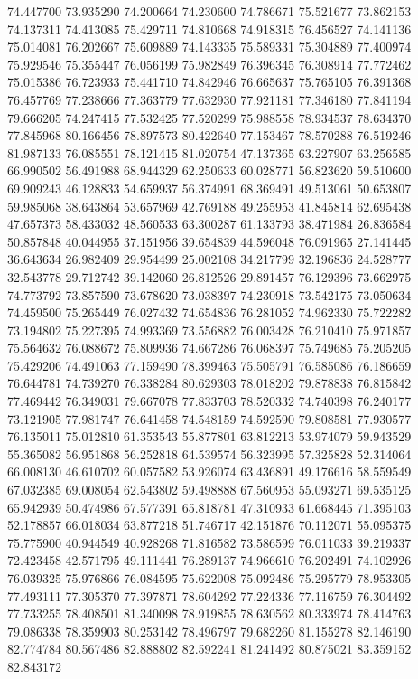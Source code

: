 74.447700
73.935290
74.200664
74.230600
74.786671
75.521677
73.862153
74.137311
74.413085
75.429711
74.810668
74.918315
76.456527
74.141136
75.014081
76.202667
75.609889
74.143335
75.589331
75.304889
77.400974
75.929546
75.355447
76.056199
75.982849
76.396345
76.308914
77.772462
75.015386
76.723933
75.441710
74.842946
76.665637
75.765105
76.391368
76.457769
77.238666
77.363779
77.632930
77.921181
77.346180
77.841194
79.666205
74.247415
77.532425
77.520299
75.988558
78.934537
78.634370
77.845968
80.166456
78.897573
80.422640
77.153467
78.570288
76.519246
81.987133
76.085551
78.121415
81.020754
47.137365
63.227907
63.256585
66.990502
56.491988
68.944329
62.250633
60.028771
56.823620
59.510600
69.909243
46.128833
54.659937
56.374991
68.369491
49.513061
50.653807
59.985068
38.643864
53.657969
42.769188
49.255953
41.845814
62.695438
47.657373
58.433032
48.560533
63.300287
61.133793
38.471984
26.836584
50.857848
40.044955
37.151956
39.654839
44.596048
76.091965
27.141445
36.643634
26.982409
29.954499
25.002108
34.217799
32.196836
24.528777
32.543778
29.712742
39.142060
26.812526
29.891457
76.129396
73.662975
74.773792
73.857590
73.678620
73.038397
74.230918
73.542175
73.050634
74.459500
75.265449
76.027432
74.654836
76.281052
74.962330
75.722282
73.194802
75.227395
74.993369
73.556882
76.003428
76.210410
75.971857
75.564632
76.088672
75.809936
74.667286
76.068397
75.749685
75.205205
75.429206
74.491063
77.159490
78.399463
75.505791
76.585086
76.186659
76.644781
74.739270
76.338284
80.629303
78.018202
79.878838
76.815842
77.469442
76.349031
79.667078
77.833703
78.520332
74.740398
76.240177
73.121905
77.981747
76.641458
74.548159
74.592590
79.808581
77.930577
76.135011
75.012810
61.353543
55.877801
63.812213
53.974079
59.943529
55.365082
56.951868
56.252818
64.539574
56.323995
57.325828
52.314064
66.008130
46.610702
60.057582
53.926074
63.436891
49.176616
58.559549
67.032385
69.008054
62.543802
59.498888
67.560953
55.093271
69.535125
65.942939
50.474986
67.577391
65.818781
47.310933
61.668445
71.395103
52.178857
66.018034
63.877218
51.746717
42.151876
70.112071
55.095375
75.775900
40.944549
40.928268
71.816582
73.586599
76.011033
39.219337
72.423458
42.571795
49.111441
76.289137
74.966610
76.202491
74.102926
76.039325
75.976866
76.084595
75.622008
75.092486
75.295779
78.953305
77.493111
77.305370
77.397871
78.604292
77.224336
77.116759
76.304492
77.733255
78.408501
81.340098
78.919855
78.630562
80.333974
78.414763
79.086338
78.359903
80.253142
78.496797
79.682260
81.155278
82.146190
82.774784
80.567486
82.888802
82.592241
81.241492
80.875021
83.359152
82.843172
